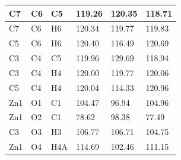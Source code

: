 \begin{table}[H]
\begin{tabular}{|l|l|l|lll|}
C7 & C6 & C5 & \multicolumn{1}{l|}{119.26} & \multicolumn{1}{l|}{120.35} & 118.71 \\ \hline
C7 & C6 & H6 & \multicolumn{1}{l|}{120.34} & \multicolumn{1}{l|}{119.77} & 119.83 \\ \hline
C5 & C6 & H6 & \multicolumn{1}{l|}{120.40} & \multicolumn{1}{l|}{116.49} & 120.69 \\ \hline
C3 & C4 & C5 & \multicolumn{1}{l|}{119.96} & \multicolumn{1}{l|}{129.69} & 118.94 \\ \hline
C3 & C4 & H4 & \multicolumn{1}{l|}{120.00} & \multicolumn{1}{l|}{119.77} & 120.06 \\ \hline
C5 & C4 & H4 & \multicolumn{1}{l|}{120.04} & \multicolumn{1}{l|}{114.33} & 120.96 \\ \hline
Zn1 & O1 & C1 & \multicolumn{1}{l|}{104.47} & \multicolumn{1}{l|}{96.94} & 104.96 \\ \hline
Zn1 & O2 & C1 & \multicolumn{1}{l|}{78.62} & \multicolumn{1}{l|}{98.38} & 77.49 \\ \hline
C3 & O3 & H3 & \multicolumn{1}{l|}{106.77} & \multicolumn{1}{l|}{106.71} & 104.75 \\ \hline
Zn1 & O4 & H4A & \multicolumn{1}{l|}{114.69} & \multicolumn{1}{l|}{102.46} & 111.15 \\ \hline
\end{tabular}
\end{table}

